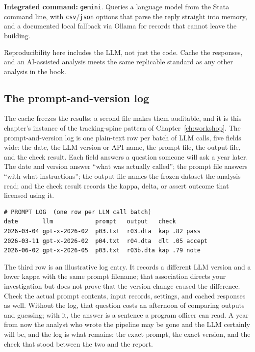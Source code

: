 \documentclass[
    a4paper,
    fontsize=10pt,
    twoside=true,
    numbers=noenddot,
]{kaobook}
\begin{document}
\begin{kaobox}[frametitle=Package Integration: \texttt{gemini}]
\textbf{Integrated command:} \texttt{gemini}. Queries a language model from the Stata command line, with \texttt{csv}/\texttt{json} options that parse the reply straight into memory, and a documented local fallback via Ollama for records that cannot leave the building.
\end{kaobox}

Reproducibility here includes the LLM, not just the code. Cache the responses, and an AI-assisted analysis meets the same replicable standard as any other analysis in the book.

\subsection{The prompt-and-version log}\label{ch13-sc-promptlog}
The cache freezes the results; a second file makes them auditable, and it is this chapter's instance of the tracking-spine pattern of Chapter~\ref{ch:workshop}. The prompt-and-version log is one plain-text row per batch of LLM calls, five fields wide: the date, the LLM version or API name, the prompt file, the output file, and the check result. Each field answers a question someone will ask a year later. The date and version answer \enquote{what was actually called}; the prompt file answers \enquote{with what instructions}; the output file names the frozen dataset the analysis read; and the check result records the kappa, delta, or assert outcome that licensed using it.
\par
{\footnotesize
\begin{verbatim}
# PROMPT LOG  (one row per LLM call batch)
date       llm            prompt   output   check
2026-03-04 gpt-x-2026-02  p03.txt  r03.dta  kap .82 pass
2026-03-11 gpt-x-2026-02  p04.txt  r04.dta  dlt .05 accept
2026-06-02 gpt-x-2026-05  p03.txt  r03b.dta kap .79 note
\end{verbatim}
}
The third row is an illustrative log entry. It records a different LLM version and a lower kappa with the same prompt filename; that association directs your investigation but does not prove that the version change caused the difference. Check the actual prompt contents, input records, settings, and cached responses as well. Without the log, that question costs an afternoon of comparing outputs and guessing; with it, the answer is a sentence a program officer can read. A year from now the analyst who wrote the pipeline may be gone and the LLM certainly will be, and the log is what remains: the exact prompt, the exact version, and the check that stood between the two and the report.
\end{document}
